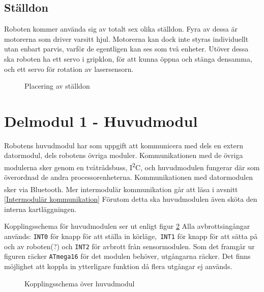 \documentclass[11pt]{article}
\begin{document}
\begin{flushleft}
\subsection{Ställdon}
Roboten kommer använda sig av totalt sex olika ställdon. Fyra av dessa är motorerna som driver varsitt hjul. Motorerna kan dock inte styras individuellt utan enbart parvis, varför de egentligen kan ses som två enheter. Utöver dessa ska roboten ha ett servo i gripklon, för att kunna öppna och stänga densamma, och ett servo för rotation av lasersensorn.
\begin{figure}[htbp]
\centering
\noindent\resizebox{.8\linewidth}{!}{
	}
	\caption{Placering av ställdon \label{ställdon}}	
\end{figure}

\pagebreak
\section{Delmodul 1 - Huvudmodul}
Robotens huvudmodul har som uppgift att kommunicera med dels en extern datormodul, dels robotens övriga moduler. Kommunikationen med de övriga modulerna sker genom en tvåtrådsbuss, I\textsuperscript{2}C, och huvudmodulen fungerar där som överordnad de andra processorenheterna. Kommunikationen med datormodulen sker via  Bluetooth\textsuperscript{\circledR}. Mer intermodulär kommunikation går att läsa i avsnitt \ref{Intermodulär kommunikation} Förutom detta ska huvudmodulen även sköta den interna kartläggningen. 

Kopplingsschema för huvudmodulen ser ut enligt figur \ref{kopplingsschema:huvudmodul} Alla avbrottsingångar används: \verb+INT0+ för knapp för att ställa in körläge,\verb+ INT1+ för knapp för att sätta på och av roboten(?) och \verb+INT2+ för avbrott från sensormodulen. Som det framgår ur figuren räcker \verb+ATmega16+ för det modulen behöver, utgångarna räcker. Det finns möjlighet att koppla in ytterligare funktion då flera utgångar ej används.  

\begin{figure}[htbp]
\centering
\noindent{}
	\caption{Kopplingsschema över huvudmodul \label{kopplingsschema:huvudmodul}}	
\end{figure}


\end{flushleft}
\end{document}
